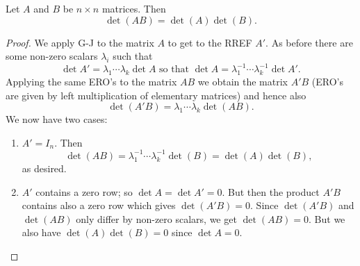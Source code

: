 \documentclass[10pt, a4paper]{article}
\begin{document}
\begin{theorem}\label{pre:linalg:thm:detsplits}
    Let $A$ and $B$ be $n \times n$ matrices.
    Then
    \[
    \det(AB) = \det(A)\det(B).
    \]
    \begin{proof}
        We apply G-J to the matrix $A$ to get to the RREF $A'$.
        As before there are some non-zero scalars $\lambda_i$ such that
        \[
        \det A' = \lambda_1\dotsi\lambda_k\det A \text{ so that } \det A = \lambda_1 ^ {-1} \dotsi\lambda_k ^ {-1}\det A'.
        \]
        Applying the same ERO's to the matrix $AB$ we obtain the matrix $A'B$ (ERO's are given by left multiplication of elementary matrices) and hence also
        \[
        \det(A'B) = \lambda_1\dotsi\lambda_k\det(AB).
        \]
        We now have two cases:
        \begin{enumerate}[label = (\roman*)]
            \item 
            $A' = I_n$.
            Then
            \[
            \det(AB) = \lambda_1 ^ {-1} \dotsi \lambda_k ^ {-1}\det(B) = \det(A)\det(B),
            \]
            as desired.
            \item $A'$ contains a zero row;
            so $\det A = \det A' = 0$.
            But then the product $A'B$ contains also a zero row which gives $\det(A'B) = 0$.
            Since $\det(A'B)$ and $\det(AB)$ only differ by non-zero scalars,
            we get $\det(AB) = 0$.
            But we also have $\det(A)\det(B) = 0$ since $\det A = 0$.
        \end{enumerate}
    \end{proof}
\end{theorem}
\end{document}
